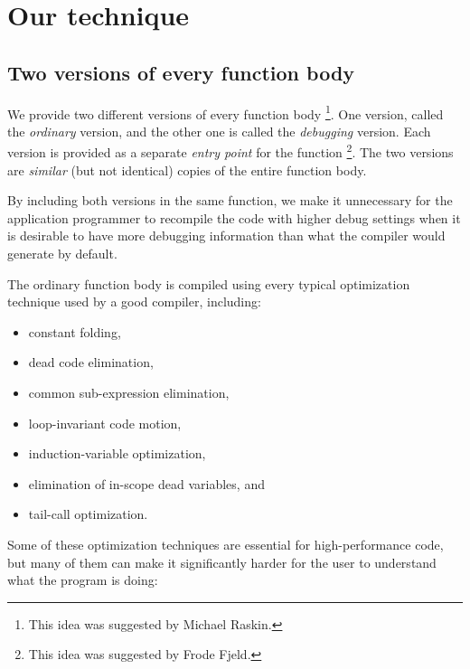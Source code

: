 \section{Our technique}
\label{sec-our-technique}

\subsection{Two versions of every function body}
\label{sec-two-body-versions}

We provide two different versions of every function body%
\footnote{This idea was suggested by Michael Raskin.}.
One version, called the \emph{ordinary} version, and the other one is
called the \emph{debugging} version.  Each version is provided as a
separate \emph{entry point} for the function%
\footnote{This idea was suggested by Frode Fjeld.}.
The two versions are \emph{similar} (but not
identical) copies of the entire function body.

By including both versions in the same function, we make it
unnecessary for the application programmer to recompile the code with
higher debug settings when it is desirable to have more debugging
information than what the compiler would generate by default.

The ordinary function body is compiled using every typical optimization
technique used by a good compiler, including:

\begin{itemize}
\item constant folding,
\item dead code elimination,
\item common sub-expression elimination,
\item loop-invariant code motion,
\item induction-variable optimization, 
\item elimination of in-scope dead variables, and
\item tail-call optimization.
\end{itemize}

\noindent
Some of these optimization techniques are essential for
high-performance code, but many of them can make it significantly
harder for the user to understand what the program is doing:


